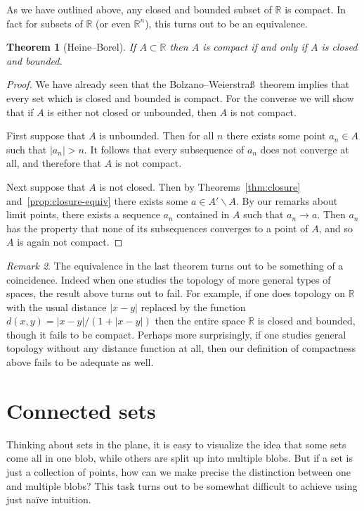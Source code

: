 \documentclass[11pt,oneside]{amsbook}
\newcommand{\RR}{\mathbb R}
\renewcommand{\setminus}{\smallsetminus}
\theoremstyle{definition}
\theoremstyle{plain}
\newtheorem{thm}{Theorem}[section]
\theoremstyle{definition}
\theoremstyle{remark}
\newtheorem{rem}[thm]{Remark}
\numberwithin{equation}{section}
\numberwithin{figure}{section}
\begin{document}
As we have outlined above, any closed and bounded subset of $\RR$ is compact. In fact for subsets of $\RR$ (or even $\RR^n$), this turns out to be an equivalence.

\begin{thm}[Heine--Borel]
  If $A\subset\RR$ then $A$ is compact if and only if $A$ is closed and bounded.
\end{thm}

\begin{proof}
  We have already seen that the Bolzano--Weierstra\ss\ theorem implies that every set which is closed and bounded is compact. For the converse we will show that if $A$ is either not closed or unbounded, then $A$ is not compact.

  First suppose that $A$ is unbounded. Then for all $n$ there exists some point $a_n\in A$ such that $|a_n|>n$. It follows that every subsequence of $a_n$ does not converge at all, and therefore that $A$ is not compact.

  Next suppose that $A$ is not closed. Then by Theorems~\ref{thm:closure} and~\ref{prop:closure-equiv} there exists some $a\in A'\setminus A$. By our remarks about limit points, there exists a sequence $a_n$ contained in $A$ such that $a_n\to a$. Then $a_n$ has the property that none of its subsequences converges to a point of $A$, and so $A$ is again not compact.
\end{proof}

\begin{rem}
  The equivalence in the last theorem turns out to be something of a coincidence. Indeed when one studies the topology of more general types of spaces, the result above turns out to fail. For example, if one does topology on $\RR$ with the usual distance $|x-y|$ replaced by the function $d(x,y)=|x-y|/(1+|x-y|)$ then the entire space $\RR$ is closed and bounded, though it fails to be compact. Perhaps more surprisingly, if one studies general topology without any distance function at all, then our definition of compactness above fails to be adequate as well.
\end{rem}

\newpage
\section{Connected sets}

Thinking about sets in the plane, it is easy to visualize the idea that some sets come all in one blob, while others are split up into multiple blobs. But if a set is just a collection of points, how can we make precise the distinction between one and multiple blobs? This task turns out to be somewhat difficult to achieve using just na\"ive intuition.
\end{document}
